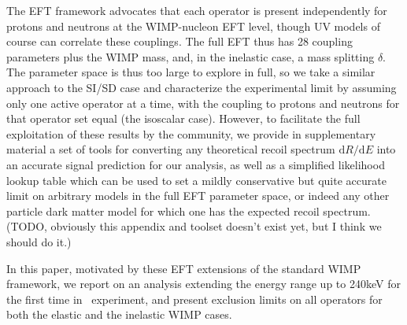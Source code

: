 The  EFT framework advocates that each operator is present independently for protons and neutrons at the WIMP-nucleon EFT level, though UV models of course can correlate these couplings. The full EFT thus has 28 coupling parameters plus the WIMP mass, and, in the inelastic case, a mass splitting $\delta$. The parameter space is thus too large to explore in full, so we take a similar approach to the SI/SD case and characterize the experimental limit by assuming only one active operator at a time, with the coupling to protons and neutrons for that operator set equal (the isoscalar case). However, to facilitate the full exploitation of these results by the community, we provide in supplementary material a set of tools for converting any theoretical recoil spectrum $\mathrm{d}R/\mathrm{d}E$ into an accurate signal prediction for our analysis, as well as a simplified likelihood lookup table which can be used to set a mildly conservative but quite accurate limit on arbitrary models in the full EFT parameter space, or indeed any other particle dark matter model for which one has the expected recoil spectrum. (TODO, obviously this appendix and toolset doesn't exist yet, but I think we should do it.) 

In this paper, motivated by these EFT extensions of the standard WIMP framework, we report on an analysis extending the energy range up to 240keV for the first time in \Xehund\ experiment, and present exclusion limits on all operators for both the elastic and the inelastic WIMP cases.     


